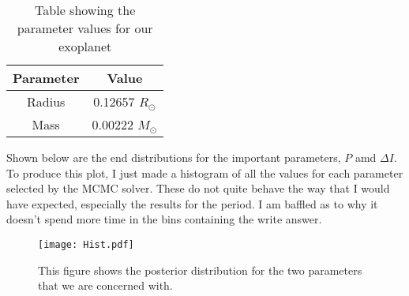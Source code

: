 \documentclass{article}
\begin{document}
\begin{table}[H]
\begin{center}
\caption{Table showing the parameter values for our exoplanet}
\begin{tabular}{|c|c|}
\hline
Parameter & Value\\
\hline
Radius & 0.12657 $R_\odot$\\
\hline
Mass  &  0.00222 $M_\odot$\\
\hline
\end{tabular}
\end{center}
\end{table}

Shown below are the end distributions for the important parameters, $P$ amd $\Delta I$. To produce this plot, I just made a histogram of all the values for each parameter selected by the MCMC solver. These do not quite behave the way that I would have expected, especially the results for the period. I am baffled as to why it doesn't spend more time in the bins containing the write answer.\\

\begin{figure}[H]
  \begin{center}
  \texttt{[image: Hist.pdf]}
  \caption{This figure shows the posterior distribution for the two parameters that we are concerned with.}\label{P}
  \end{center}
\end{figure}


\begin{comment}




\begin{figure}[H]\label{fft}
  \begin{center}
  \texttt{[image: Figure2.pdf]}
  \caption{Strain plotted as a function of time in days. This plot simply shows our original data set.}
  \end{center}
\end{figure}

\end{comment}
\end{document}
